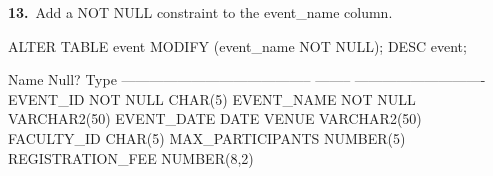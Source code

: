 
\noindent\begin{minipage}{\linewidth}
\begingroup{}
{\fontsize{14}{17}\selectfont\textbf{13.}}\ Add a NOT NULL constraint to the event\_name column.\par
\endgroup\vspace{12pt}


\begin{sqlcode}
ALTER TABLE event MODIFY (event_name NOT NULL);
DESC event;
\end{sqlcode}

\vspace{18pt}


\begin{sqlout}
 Name                                      Null?    Type
 ----------------------------------------- -------- ----------------------------
 EVENT_ID                                  NOT NULL CHAR(5)
 EVENT_NAME                                NOT NULL VARCHAR2(50)
 EVENT_DATE                                         DATE
 VENUE                                              VARCHAR2(50)
 FACULTY_ID                                         CHAR(5)
 MAX_PARTICIPANTS                                   NUMBER(5)
 REGISTRATION_FEE                                   NUMBER(8,2)
\end{sqlout}
\end{minipage}\par\vspace{30pt}

